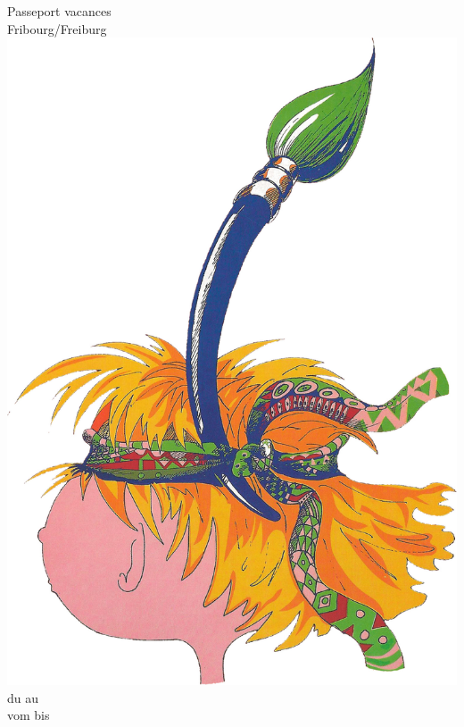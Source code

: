 \usepackage[nohead, textwidth=16.5cm, textheight=23.5cm, ignorehead, paper=a4paper]{geometry}
\usepackage{fontspec}
\usepackage{graphicx}
\usepackage[french]{babel}
\usepackage{hyperref}
\usepackage{tikz}
\usepackage{enumitem}
\usepackage{url}
\usepackage{tabulary}
\usepackage{enumitem}
\usepackage{titletoc}
\usepackage{etoolbox}
\usepackage{intcalc}
\usepackage[absolute]{textpos}




\setmainfont{Alegreya Sans}

\renewcommand{\leftmark}{}
\renewcommand{\rightmark}{}



\frontmatter
\begin{titlepage}
\begin{center}
{\fontsize{45}{40}\selectfont{}\pvfred{} Passeport vacances\\
\vspace*{3mm}
Fribourg/Freiburg \pvfryear}
\vfill
\includegraphics[width=.7\textwidth]{fig/logo.jpg}
\vfill
{\fontsize{32}{32}\selectfont{}du \pvfrstartfr{} au \pvfrendfr{} \pvfryear}\\
\vspace*{3mm}
{\fontsize{32}{32}\selectfont{}vom \pvfrstartde{} bis \pvfrendde{} \pvfryear}

\end{center}
\end{titlepage}
\ifbare
\else
\clearpage

\fi
\cleardoublepage
\tableofcontents
\cleardoublepage


